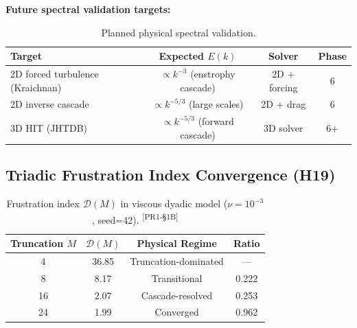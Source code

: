 \documentclass[11pt,a4paper,twoside]{article}
\newcommand{\DM}{\mathcal{D}(M)}
\newcommand{\prtag}[1]{\textsuperscript{\color{Dandelion!70!black}[PR1-\S#1]}}
\begin{document}
\textbf{Future spectral validation targets:}
\begin{table}[H]
\centering
\caption{Planned physical spectral validation.}
\label{tab:spectral_future}
\begin{tabular}{lccc}
\toprule
\textbf{Target} & \textbf{Expected $E(k)$} & \textbf{Solver} & \textbf{Phase} \\
\midrule
2D forced turbulence (Kraichnan) & $\propto k^{-3}$ (enstrophy cascade) & 2D + forcing & 6 \\
2D inverse cascade & $\propto k^{-5/3}$ (large scales) & 2D + drag & 6 \\
3D HIT (JHTDB) & $\propto k^{-5/3}$ (forward cascade) & 3D solver & 6+ \\
\bottomrule
\end{tabular}
\end{table}

\subsection{Triadic Frustration Index Convergence (H19)}

\begin{table}[H]
\centering
\caption{Frustration index $\DM$ in viscous dyadic model ($\nu = 10^{-3}$, seed=42). \prtag{1B}}
\label{tab:h19}
\begin{tabular}{cccc}
\toprule
Truncation $M$ & $\DM$ & Physical Regime & Ratio \\
\midrule
4  & 36.85 & Truncation-dominated & --- \\
8  & 8.17  & Transitional & 0.222 \\
16 & 2.07  & Cascade-resolved & 0.253 \\
24 & 1.99  & Converged & 0.962 \\
\bottomrule
\end{tabular}
\end{table}
\end{document}
